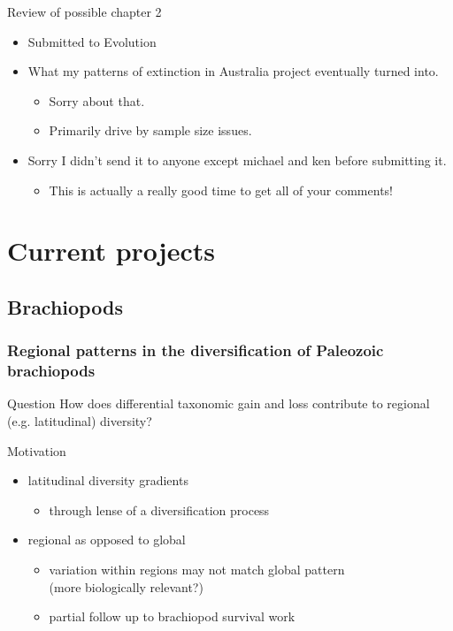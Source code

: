 \documentclass{beamer}
\begin{document}
\begin{frame}
  \begin{block}{Review of possible chapter 2}
    \begin{itemize}
      \item Submitted to Evolution
      \item What my patterns of extinction in Australia project eventually turned into.
        \begin{itemize}
          \item Sorry about that.
          \item Primarily drive by sample size issues.
        \end{itemize}
      \item Sorry I didn't send it to anyone except michael and ken before submitting it.
        \begin{itemize}
          \item This is actually a really good time to get all of your comments!
        \end{itemize}
    \end{itemize}
  \end{block}
\end{frame}


\section{Current projects}
\subsection{Brachiopods}
\begin{frame}
  \frametitle{Regional patterns in the diversification of Paleozoic brachiopods}
  \begin{alertblock}{Question}
    How does differential taxonomic gain and loss contribute to regional (e.g. latitudinal) diversity?
  \end{alertblock}
\end{frame}

\begin{frame}
  \begin{block}{Motivation}
    \begin{itemize}
      \item latitudinal diversity gradients
        \begin{itemize}
          \item through lense of a diversification process
        \end{itemize}
      \item regional as opposed to global
        \begin{itemize}
          \item variation within regions may not match global pattern \\(more biologically relevant?)
          \item partial follow up to brachiopod survival work
        \end{itemize}
    \end{itemize}
  \end{block}
\end{frame}
\end{document}
